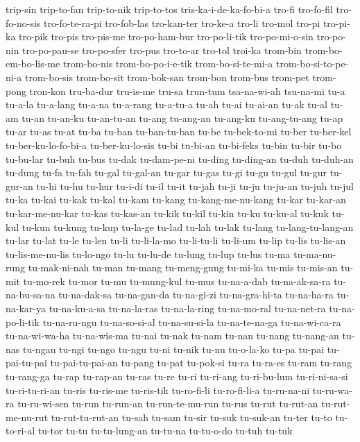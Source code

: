 {trip-sin trip-to-fan trip-to-nik trip-to-tos tris-ka-i-de-ka-fo-bi-a
tro-fi tro-fo-fil tro-fo-no-sis tro-fo-te-ra-pi tro-fob-las tro-kan-ter
tro-ke-a tro-li tro-mol tro-pi tro-pi-ka tro-pik tro-pis tro-pis-me
tro-po-ham-bur tro-po-li-tik tro-po-mi-o-sin tro-po-nin tro-po-pau-se
tro-po-sfer tro-pus tro-to-ar tro-tol troi-ka trom-bin
trom-bo-em-bo-lis-me trom-bo-nis trom-bo-po-i-e-tik trom-bo-si-te-mi-a
trom-bo-si-to-pe-ni-a trom-bo-sis trom-bo-sit trom-bok-san trom-bon
trom-bus trom-pet trom-pong tron-kon tru-ba-dur tru-is-me tru-sa trun-tum
tsa-na-wi-ah tsu-na-mi tu-a tu-a-la tu-a-lang tu-a-na tu-a-rang tu-a-tu-a
tu-ah tu-ai tu-ai-an tu-ak tu-al tu-am tu-an tu-an-ku tu-an-tu-an tu-ang
tu-ang-an tu-ang-ku tu-ang-tu-ang tu-ap tu-ar tu-as tu-at tu-ba tu-ban
tu-ban-tu-ban tu-be tu-bek-to-mi tu-ber tu-ber-kel tu-ber-ku-lo-fo-bi-a
tu-ber-ku-lo-sis tu-bi tu-bi-an tu-bi-feks tu-bin tu-bir tu-bo tu-bu-lar
tu-buh tu-bus tu-dak tu-dam-pe-ni tu-ding tu-ding-an tu-duh tu-duh-an
tu-dung tu-fa tu-fah tu-gal tu-gal-an tu-gar tu-gas tu-gi tu-gu tu-gul
tu-gur tu-gur-an tu-hi tu-hu tu-hur tu-i-di tu-il tu-it tu-jah tu-ji tu-ju
tu-ju-an tu-juh tu-jul tu-ka tu-kai tu-kak tu-kal tu-kam tu-kang
tu-kang-me-nu-kang tu-kar tu-kar-an tu-kar-me-nu-kar tu-kas tu-kas-an
tu-kik tu-kil tu-kin tu-ku tu-ku-al tu-kuk tu-kul tu-kun tu-kung tu-kup
tu-la-ge tu-lad tu-lah tu-lak tu-lang tu-lang-tu-lang-an tu-lar tu-lat
tu-le tu-len tu-li tu-li-la-mo tu-li-tu-li tu-li-um tu-lip tu-lis
tu-lis-an tu-lis-me-nu-lis tu-lo-ngo tu-lu tu-lu-de tu-lung tu-lup tu-lus
tu-ma tu-ma-nu-rung tu-mak-ni-nah tu-man tu-mang tu-meng-gung tu-mi-ka
tu-mis tu-mis-an tu-mit tu-mo-rek tu-mor tu-mu tu-mung-kul tu-mus
tu-na-a-dab tu-na-ak-sa-ra tu-na-bu-sa-na tu-na-dak-sa tu-na-gan-da
tu-na-gi-zi tu-na-gra-hi-ta tu-na-ha-ra tu-na-kar-ya tu-na-ku-a-sa
tu-na-la-ras tu-na-la-ring tu-na-mo-ral tu-na-net-ra tu-na-po-li-tik
tu-na-ru-ngu tu-na-so-si-al tu-na-su-si-la tu-na-te-na-ga tu-na-wi-ca-ra
tu-na-wi-wa-ha tu-na-wis-ma tu-nai tu-nak tu-nam tu-nan tu-nang tu-nang-an
tu-nas tu-ngau tu-ngi tu-ngo tu-ngu tu-ni tu-nik tu-nu tu-o-la-ko tu-pa
tu-pai tu-pai-tu-pai tu-pai-tu-pai-an tu-pang tu-pat tu-pok-si tu-ra
tu-ra-es tu-ram tu-rang tu-rang-ga tu-rap tu-rap-an tu-ras tu-re tu-ri
tu-ri-ang tu-ri-bu-lum tu-ri-ni-sa-si tu-ri-tu-ri-an tu-ris tu-ris-me
tu-ris-tik tu-ro-fi-li tu-ro-fi-li-a tu-ru-na-ni tu-ru-wa-ra tu-ru-wi-sen
tu-run tu-run-an tu-run-te-mu-run tu-rus tu-rut tu-rut-an tu-rut-me-nu-rut
tu-rut-tu-rut-an tu-sah tu-sam tu-sir tu-suk tu-suk-an tu-ter tu-to
tu-to-ri-al tu-tor tu-tu tu-tu-lung-an tu-tu-na tu-tu-o-do tu-tuh tu-tuk
}
